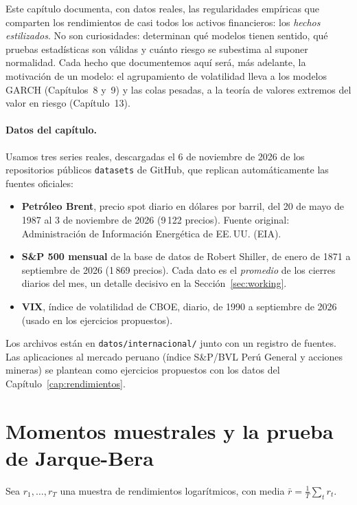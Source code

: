 Este capítulo documenta, con datos reales, las regularidades empíricas que comparten los rendimientos de
casi todos los activos financieros: los \emph{hechos estilizados}. No son curiosidades: determinan qué
modelos tienen sentido, qué pruebas estadísticas son válidas y cuánto riesgo se subestima al suponer
normalidad. Cada hecho que documentemos aquí será, más adelante, la motivación de un modelo: el
agrupamiento de volatilidad lleva a los modelos GARCH (Capítulos~8 y~9) y las colas pesadas, a la teoría
de valores extremos del valor en riesgo (Capítulo~13).

\paragraph{Datos del capítulo.} Usamos tres series reales, descargadas el 6 de noviembre de 2026 de los
repositorios públicos \texttt{datasets} de GitHub, que replican automáticamente las fuentes oficiales:
\begin{itemize}[leftmargin=*]
  \item \textbf{Petróleo Brent}, precio spot diario en dólares por barril, del 20 de mayo de 1987 al 3 de
        noviembre de 2026 (9\,122 precios). Fuente original: Administración de Información Energética de
        EE.\,UU. (EIA).
  \item \textbf{S\&P 500 mensual} de la base de datos de Robert Shiller, de enero de 1871 a septiembre de
        2026 (1\,869 precios). Cada dato es el \emph{promedio} de los cierres diarios del mes, un detalle
        decisivo en la Sección~\ref{sec:working}.
  \item \textbf{VIX}, índice de volatilidad de CBOE, diario, de 1990 a septiembre de 2026 (usado en los
        ejercicios propuestos).
\end{itemize}
Los archivos están en \texttt{datos/internacional/} junto con un registro de fuentes. Las aplicaciones
al mercado peruano (índice S\&P/BVL Perú General y acciones mineras) se plantean como ejercicios
propuestos con los datos del Capítulo~\ref{cap:rendimientos}.

\section{Momentos muestrales y la prueba de Jarque-Bera}

Sea $r_1,\dots,r_T$ una muestra de rendimientos logarítmicos, con media $\bar r=\frac1T\sum_tr_t$.

